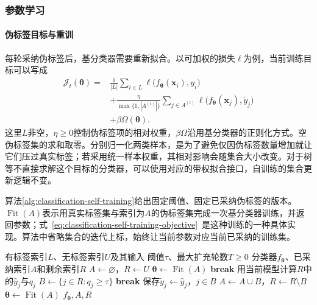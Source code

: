 \subsubsection{参数学习}
\label{sec:classification-self-training-learning}

\paragraph{伪标签目标与重训}
每轮采纳伪标签后，基分类器需要重新拟合。以可加权的损失$\ell$为例，当前训练目标可以写成
\begin{equation}
  \label{eq:classification-self-training-objective}
  \begin{aligned}
    \mathcal{J}_t(\bm{\theta})
      ={}&\frac{1}{|L|}\sum_{i\in L}
        \ell\bigl(f_{\bm{\theta}}(\bm{x}_i),y_i\bigr)\\
      &+\frac{\eta}{\max\{1,|A^{(t)}|\}}
        \sum_{j\in A^{(t)}}
        \ell\bigl(f_{\bm{\theta}}(\bm{x}_j),\widetilde y_j\bigr)\\
      &+\beta\Omega(\bm{\theta}).
  \end{aligned}
\end{equation}
这里$L$非空，$\eta\geq0$控制伪标签项的相对权重，$\beta\Omega$沿用基分类器的正则化方式。空伪标签集的求和取零。分别归一化两类样本，是为了避免仅因伪标签数量增加就让它们压过真实标签；若采用统一样本权重，其相对影响会随集合大小改变。对于树等不直接求解这个目标的分类器，可以使用对应的带权拟合接口，自训练的集合更新逻辑不变。

算法\ref{alg:classification-self-training}给出固定阈值、固定已采纳伪标签的版本。$\operatorname{Fit}(A)$表示用真实标签集与索引为$A$的伪标签集完成一次基分类器训练，并返回参数；式~\eqref{eq:classification-self-training-objective}~是这种训练的一种具体实现。算法中省略集合的迭代上标，始终让当前参数对应当前已采纳的训练集。

\begin{algorithm}[带最终重训的自训练]
  \label{alg:classification-self-training}
  \begin{algorithmic}[1]
    \Require 有标签索引$L$、无标签索引$U$及其输入
    \Require 阈值$\tau$、最大扩充轮数$T\geq0$
    \Ensure 分类器$f_{\bm{\theta}}$、已采纳索引$A$和剩余索引$R$
    \State $A\gets\varnothing$，$R\gets U$
    \State $\bm{\theta}\gets\operatorname{Fit}(A)$
        \State \textbf{break}
      \EndIf
      \State 用当前模型计算$R$中的$\widehat y_j$与$q_j$
      \State $B\gets\{j\in R:q_j\geq\tau\}$
        \State \textbf{break}
      \EndIf
      \State 保存$\widetilde y_j\gets\widehat y_j$，$j\in B$
      \State $A\gets A\cup B$，$R\gets R\setminus B$
      \State $\bm{\theta}\gets\operatorname{Fit}(A)$
    \EndFor
    \State \Return $f_{\bm{\theta}},A,R$
  \end{algorithmic}
\end{algorithm}

